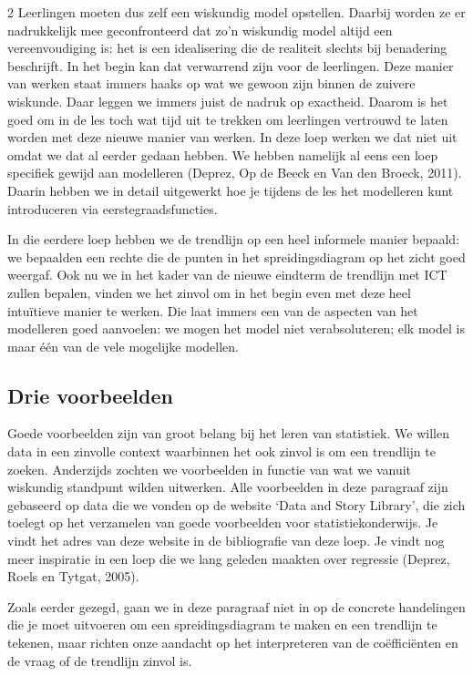 \begin{multicols}{2}
Leerlingen moeten dus zelf een wiskundig model opstellen. Daarbij worden ze er nadrukkelijk mee geconfronteerd dat zo’n wiskundig model altijd een vereenvoudiging is: het is een idealisering die de realiteit slechts bij benadering beschrijft. In het begin kan dat verwarrend zijn voor de leerlingen. Deze manier van werken staat immers haaks op wat we gewoon zijn binnen de zuivere wiskunde. Daar leggen we immers juist de nadruk op exactheid. Daarom is het goed om in de les toch wat tijd uit te trekken om leerlingen vertrouwd te laten worden met deze nieuwe manier van werken. In deze loep werken we dat niet uit omdat we dat al eerder gedaan hebben. We hebben namelijk al eens een loep specifiek gewijd aan modelleren (Deprez, Op de Beeck en Van den Broeck, 2011). Daarin hebben we in detail uitgewerkt hoe je tijdens de les het modelleren kunt introduceren via eerstegraadsfuncties.

In die eerdere loep hebben we de trendlijn op een heel informele manier bepaald: we bepaalden een rechte die de punten in het spreidingsdiagram op het zicht goed weergaf. Ook nu we in het kader van de nieuwe eindterm de trendlijn met ICT zullen bepalen, vinden we het zinvol om in het begin even met deze heel intuïtieve manier te werken. Die laat immers een van de aspecten van het modelleren goed aanvoelen: we mogen het model niet verabsoluteren; elk model is maar één van de vele mogelijke modellen.

\subsection{Drie voorbeelden}
Goede voorbeelden zijn van groot belang bij het leren van statistiek. We willen data in een zinvolle context waarbinnen het ook zinvol is om een trendlijn te zoeken. Anderzijds zochten we voorbeelden in functie van wat we vanuit wiskundig standpunt wilden uitwerken. Alle voorbeelden in deze paragraaf zijn gebaseerd op data die we vonden op de website `Data and Story Library’, die zich toelegt op het verzamelen van goede voorbeelden voor statistiekonderwijs. Je vindt het adres van deze website in de bibliografie van deze loep. Je vindt nog meer inspiratie in een loep die we lang geleden maakten over regressie (Deprez, Roels en Tytgat, 2005).

Zoals eerder gezegd, gaan we in deze paragraaf niet in op de concrete handelingen die je moet uitvoeren om een spreidingsdiagram te maken en een trendlijn te tekenen, maar richten onze aandacht op het interpreteren van de coëfficiënten en de vraag of de trendlijn zinvol is. 


\end{multicols}
